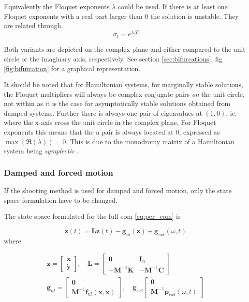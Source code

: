 Equivalently the Floquet exponents $\lambda$ could be used. If there is at least
one Floquet exponents with a real part larger than 0 the solution is unstable.
They are related through,
\begin{equation}
  \label{eq:floquet_relations}
  \sigma_i = e^{\lambda_i T}
\end{equation}

Both variants are depicted on the complex plane and either compared to the unit
circle or the imaginary axis, respectively. See section \ref{sec:bifurcations},
fig \ref{fig:bifurcation} for a graphical representation.

It should be noted that for Hamiltonian systems, for marginally stable
solutions, the Floquet multipliers will always be complex conjugate pairs
\textit{on} the unit circle, not within as it is the case for asymptotically
stable solutions obtained from damped systems.
Further there is always one pair of eigenvalues at $(1,0)$, ie. where the x-axis
cross the unit circle in the complex plane. For Floquet exponents this means
that the a pair is always located at 0, expressed as $\max(\Re(\lambda)) = 0$.
This is due to the monodromy matrix of a Hamiltonian system being
\textit{symplectic} \autocite{steves2006a}.


\subsubsection{Damped and forced motion}

If the shooting method is used for damped and forced motion, only the state
space formulation have to be changed.

The state space formulated for the full eom \eqref{eq:per_eom} is

\begin{equation}
  \label{eq:app_state_space}
  \dot{\bm z}(t) = \bm L\bm z(t) - \bm g_{nl}(\bm z) + \bm g_{ext}(\omega,t)
\end{equation}
where

\begin{equation}
  \begin{aligned}
    \bm z =
    \begin{bmatrix}
      \bm x \\ \dot{\bm y}
    \end{bmatrix}, \quad
    \bm L =
    \begin{bmatrix}
      \bm 0 & \bm I_n \\
      -\bm M^{-1}\bm K & -\bm M^{-1} \bm C
    \end{bmatrix} \\
    \bm g_{nl} =
    \begin{bmatrix}
      \bm 0 \\ \bm M^{-1} \bm f_{nl}(\bm x, \dot{\bm x})
    \end{bmatrix}, \quad
    \bm g_{ext}
    \begin{bmatrix}
      \bm 0 \\ \bm M^{-1} \bm p_{ext}(\omega, t)
    \end{bmatrix}
  \end{aligned}
\end{equation}

